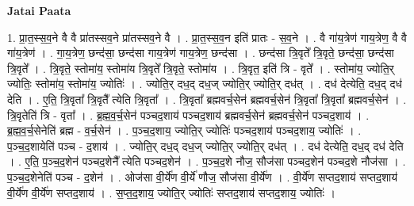 \documentclass[17pt]{extarticle}
\begin{document}
\textbf{Jatai Paata} \newline

1. प्रा॒त॒स्स॒व॒ने वै वै प्रा॑तस्सव॒ने प्रा॑तस्सव॒ने वै । . प्रा॒त॒स्स॒व॒न इति॑ प्रातः - स॒व॒ने । . वै गा॑य॒त्रेण॑ गाय॒त्रेण॒ वै वै गा॑य॒त्रेण॑ । . गा॒य॒त्रेण॒ छन्द॑सा॒ छन्द॑सा गाय॒त्रेण॑ गाय॒त्रेण॒ छन्द॑सा । . छन्द॑सा त्रि॒वृते᳚ त्रि॒वृते॒ छन्द॑सा॒ छन्द॑सा त्रि॒वृते᳚ । . त्रि॒वृते॒ स्तोमा॑य॒ स्तोमा॑य त्रि॒वृते᳚ त्रि॒वृते॒ स्तोमा॑य । . त्रि॒वृत॒ इति॑ त्रि - वृते᳚ । . स्तोमा॑य॒ ज्योति॒र् ज्योतिः॒ स्तोमा॑य॒ स्तोमा॑य॒ ज्योतिः॑ । . ज्योति॒र् दध॒द् दध॒ज् ज्योति॒र् ज्योति॒र् दध॑त् । . दध॑ देत्येति॒ दध॒द् दध॑ देति । . ए॒ति॒ त्रि॒वृता᳚ त्रि॒वृतै᳚ त्येति त्रि॒वृता᳚ । . त्रि॒वृता᳚ ब्रह्मवर्च॒सेन॑ ब्रह्मवर्च॒सेन॑ त्रि॒वृता᳚ त्रि॒वृता᳚ ब्रह्मवर्च॒सेन॑ । . त्रि॒वृतेति॑ त्रि - वृता᳚ । . ब्र॒ह्म॒व॒र्च॒सेन॑ पञ्चद॒शाय॑ पञ्चद॒शाय॑ ब्रह्मवर्च॒सेन॑ ब्रह्मवर्च॒सेन॑ पञ्चद॒शाय॑ । . ब्र॒ह्म॒व॒र्च॒सेनेति॑ ब्रह्म - व॒र्च॒सेन॑ । . प॒ञ्च॒द॒शाय॒ ज्योति॒र् ज्योतिः॑ पञ्चद॒शाय॑ पञ्चद॒शाय॒ ज्योतिः॑ । . प॒ञ्च॒द॒शायेति॑ पञ्च - द॒शाय॑ । . ज्योति॒र् दध॒द् दध॒ज् ज्योति॒र् ज्योति॒र् दध॑त् । . दध॑ देत्येति॒ दध॒द् दध॑ देति । . ए॒ति॒ प॒ञ्च॒द॒शेन॑ पञ्चद॒शेनै᳚ त्येति पञ्चद॒शेन॑ । . प॒ञ्च॒द॒शे नौज॒ सौज॑सा पञ्चद॒शेन॑ पञ्चद॒शे नौज॑सा । . प॒ञ्च॒द॒शेनेति॑ पञ्च - द॒शेन॑ । . ओज॑सा वी॒र्ये॑ण वी॒र्ये॑ णौज॒ सौज॑सा वी॒र्ये॑ण । . वी॒र्ये॑ण सप्तद॒शाय॑ सप्तद॒शाय॑ वी॒र्ये॑ण वी॒र्ये॑ण सप्तद॒शाय॑ । . स॒प्त॒द॒शाय॒ ज्योति॒र् ज्योतिः॑ सप्तद॒शाय॑ सप्तद॒शाय॒ ज्योतिः॑ । \newline
\end{document}
